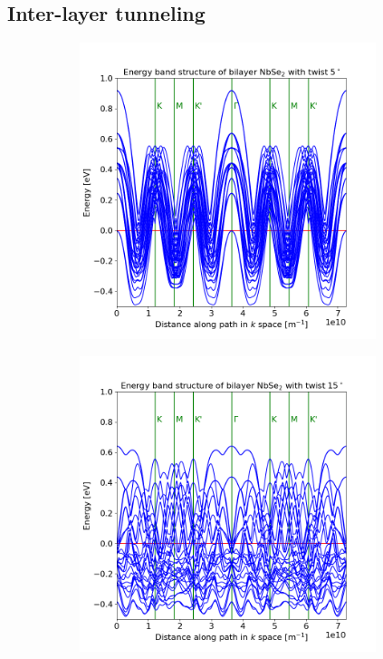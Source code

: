 \documentclass[12pt]{report} %
\begin{document}
\subsection*{Inter-layer tunneling}

\begin{figure}[t!]
\centering
  \begin{subfigure}[t]{0.45\textwidth}
    \centering
    \includegraphics[width=0.95\textwidth]{bilayer_bands_5_coupled.png}
    \caption{
    }
    \label{bilayer_bands_5_coupled}
  \end{subfigure}
  \hfill
  \begin{subfigure}[t]{0.45\textwidth}
    \centering
    \includegraphics[width=0.95\textwidth]{bilayer_bands_15_coupled.png}
    \caption{
    }
    \label{bilayer_bands_15_coupled}
  \end{subfigure}
  \caption{}
  \label{bilayer_bands_coupled}
\end{figure}
\end{document}
